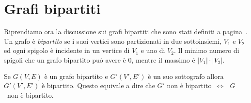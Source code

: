 \section{Grafi bipartiti}
Riprendiamo ora la discussione sui grafi bipartiti che sono stati definiti a pagina~\pageref{bip}.
Un grafo è \emph{bipartito} se i suoi vertici sono partizionati in due sottoinsiemi,
$V_1$ e $V_2$ ed ogni spigolo è incidente in un vertice di $V_1$ e uno di $V_2$.
Il minimo numero di spigoli che un grafo bipartito può avere è $0$, mentre il massimo é 
$|V_1|\cdot|V_2|$.

\begin{prop}
Se $G(V,E)$ è un grafo bipartito e $G'(V',E')$ è un suo sottografo allora
$G'(V',E')$ è bipartito.
Questo equivale a dire che $G'$ non è bipartito~$\iff \text{ } G$~non è bipartito. 
\end{prop}

